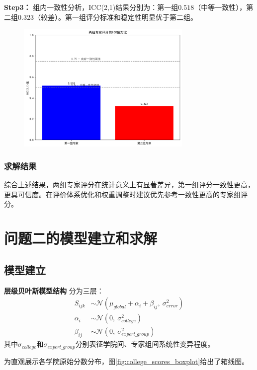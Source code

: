 \documentclass[withoutpreface,bwprint]{cumcmthesis}
\begin{document}
\textbf{Step3：} 组内一致性分析，ICC(2,1)结果分别为：第一组$0.518$（中等一致性），第二组$0.323$（较差）。第一组评分标准和稳定性明显优于第二组。


\begin{figure}[H]
\centering
\includegraphics[width=0.75\textwidth]{figures/icc_analysis.png}
\label{fig:单图}
\end{figure}

\subsubsection{求解结果}
综合上述结果，两组专家评分在统计意义上有显著差异，第一组评分一致性更高，更具可信度。在评价体系优化和权重调整时建议优先参考一致性更高的专家组评分。


\section{问题二的模型建立和求解}
\subsection{模型建立}
\textbf{层级贝叶斯模型结构}
分为三层：
\begin{align*}
    S_{ijk} &\sim \mathcal{N}(\mu_{global} + \alpha_i + \beta_{ij},\ \sigma_{error}^2) \\
    \alpha_i &\sim \mathcal{N}(0,\ \sigma_{college}^2) \\
    \beta_{ij} &\sim \mathcal{N}(0,\ \sigma_{expert\_group}^2)
\end{align*}
其中$\sigma_{college}$和$\sigma_{expert\_group}$分别表征学院间、专家组间系统性变异程度。

为直观展示各学院原始分数分布，图\ref{fig:college_scores_boxplot}给出了箱线图。
\end{document}

